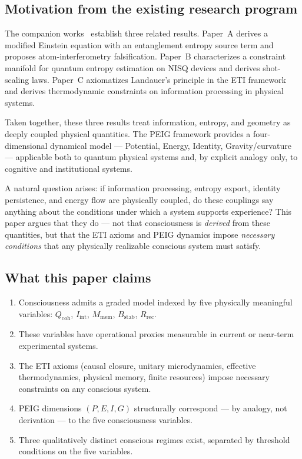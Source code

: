 \documentclass[12pt,letterpaper]{article}
\newcommand{\Qcoh}{Q_{\mathrm{coh}}}
\newcommand{\Iint}{I_{\mathrm{int}}}
\newcommand{\Mmem}{M_{\mathrm{mem}}}
\newcommand{\Bstab}{B_{\mathrm{stab}}}
\newcommand{\Rrec}{R_{\mathrm{rec}}}
\begin{document}
\subsection{Motivation from the existing research program}

The companion works~\cite{Monette2026a,Monette2026b,Monette2026c} establish
three related results. Paper~A derives a modified Einstein equation with an
entanglement entropy source term and proposes atom-interferometry falsification.
Paper~B characterizes a constraint manifold for quantum entropy estimation on
NISQ devices and derives shot-scaling laws. Paper~C axiomatizes Landauer's
principle in the ETI framework and derives thermodynamic constraints on
information processing in physical systems.

Taken together, these three results treat information, entropy, and geometry as
deeply coupled physical quantities. The PEIG framework \cite{Monette2026a}
provides a four-dimensional dynamical model --- Potential, Energy, Identity,
Gravity/curvature --- applicable both to quantum physical systems and, by
explicit analogy only, to cognitive and institutional systems.

A natural question arises: if information processing, entropy export, identity
persistence, and energy flow are physically coupled, do these couplings say
anything about the conditions under which a system supports experience? This
paper argues that they do --- not that consciousness is \emph{derived} from these
quantities, but that the ETI axioms and PEIG dynamics impose \emph{necessary
conditions} that any physically realizable conscious system must satisfy.

\subsection{What this paper claims}

\begin{enumerate}[label=(\roman*)]
  \item Consciousness admits a graded model indexed by five physically meaningful
    variables: $\Qcoh$, $\Iint$, $\Mmem$, $\Bstab$, $\Rrec$.
  \item These variables have operational proxies measurable in current or
    near-term experimental systems.
  \item The ETI axioms (causal closure, unitary microdynamics, effective
    thermodynamics, physical memory, finite resources) impose necessary constraints
    on any conscious system.
  \item PEIG dimensions $(P, E, I, G)$ structurally correspond --- by analogy, not
    derivation --- to the five consciousness variables.
  \item Three qualitatively distinct conscious regimes exist, separated by
    threshold conditions on the five variables.
\end{enumerate}
\end{document}
